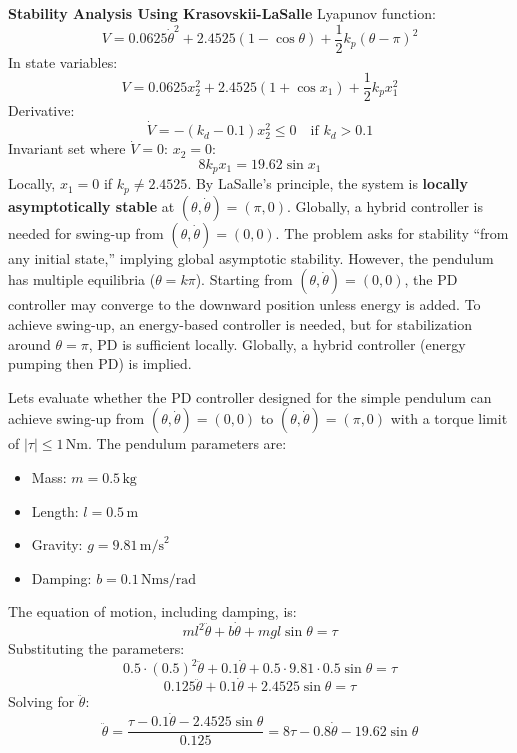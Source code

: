 \documentclass[12pt,a4paper]{article}
\begin{document}
\textbf{Stability Analysis Using Krasovskii-LaSalle}
Lyapunov function:
\[
V = 0.0625 \dot{\theta}^2 + 2.4525 (1 - \cos \theta) + \frac{1}{2} k_p (\theta - \pi)^2
\]
In state variables:
\[
V = 0.0625 x_2^2 + 2.4525 (1 + \cos x_1) + \frac{1}{2} k_p x_1^2
\]
Derivative:
\[
\dot{V} = -(k_d - 0.1) x_2^2 \leq 0 \quad \text{if } k_d > 0.1
\]
Invariant set where \(\dot{V} = 0\): \(x_2 = 0\):
\[
8 k_p x_1 = 19.62 \sin x_1
\]
Locally, \(x_1 = 0\) if \(k_p \neq 2.4525\). By LaSalle’s principle, the system is \textbf{locally asymptotically stable} at \((\theta, \dot{\theta}) = (\pi, 0)\). Globally, a hybrid controller is needed for swing-up from \((\theta, \dot{\theta}) = (0, 0)\).
The problem asks for stability “from any initial state,” implying global asymptotic stability. However, the pendulum has multiple equilibria ($\theta = k\pi$). Starting from $(\theta, \dot{\theta}) = (0, 0)$, the PD controller may converge to the downward position unless energy is added. To achieve swing-up, an energy-based controller is needed, but for stabilization around $\theta = \pi$, PD is sufficient locally. Globally, a hybrid controller (energy pumping then PD) is implied.

Lets evaluate whether the PD controller designed for the simple pendulum can achieve swing-up from \((\theta, \dot{\theta}) = (0, 0)\) to \((\theta, \dot{\theta}) = (\pi, 0)\) with a torque limit of \(|\tau| \leq 1 \, \text{Nm}\). The pendulum parameters are:
\begin{itemize}
    \item Mass: \(m = 0.5 \, \text{kg}\)
    \item Length: \(l = 0.5 \, \text{m}\)
    \item Gravity: \(g = 9.81 \, \text{m/s}^2\)
    \item Damping: \(b = 0.1 \, \text{Nms/rad}\)
\end{itemize}

The equation of motion, including damping, is:
\[
m l^2 \ddot{\theta} + b \dot{\theta} + m g l \sin \theta = \tau
\]
Substituting the parameters:
\[
0.5 \cdot (0.5)^2 \ddot{\theta} + 0.1 \dot{\theta} + 0.5 \cdot 9.81 \cdot 0.5 \sin \theta = \tau
\]
\[
0.125 \ddot{\theta} + 0.1 \dot{\theta} + 2.4525 \sin \theta = \tau
\]
Solving for \(\ddot{\theta}\):
\begin{equation}
    \ddot{\theta} = \frac{\tau - 0.1 \dot{\theta} - 2.4525 \sin \theta}{0.125} = 8 \tau - 0.8 \dot{\theta} - 19.62 \sin \theta
\end{equation}
\end{document}
